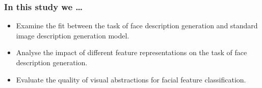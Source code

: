 \documentclass[aspectratio=1610]{beamer} %
\newcommand{\squeezeup}{\vspace{-3mm}}
\newcommand{\squeezedown}{\vspace{2.5mm}}
\begin{document}
\begin{frame}
\vspace{-.3cm}
\begin{figure}[htbp]
\centering
{}
{}
{}

\label{fig:taskdiff}
\end{figure}
\bigskip
\end{frame}


\begin{frame}
\frametitle{In this study we \ldots}
\begin{itemize}
	\item Examine the fit between the task of face description generation and standard image description generation model.
	\item Analyse the impact of different feature representations on the task of face description generation.
	\item Evaluate the quality of visual abstractions for facial feature classification.
\end{itemize}
\end{frame}
\end{document}
